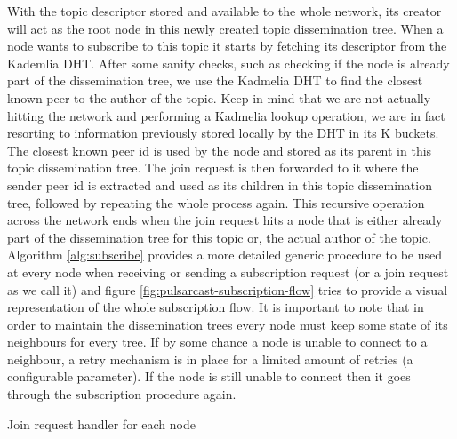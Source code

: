 With the topic descriptor stored and available to the whole network, its
creator will act as the root node in this newly created topic dissemination
tree. When a node wants to subscribe to this topic it starts by fetching its
descriptor from the Kademlia DHT. After some sanity checks, such as checking if
the node is already part of the dissemination tree, we use the Kadmelia DHT to
find the closest known peer to the author of the topic. Keep in mind that we
are not actually hitting the network and performing a Kadmelia lookup
operation, we are in fact resorting to information previously stored locally by
the DHT in its K buckets. The closest known peer id is used by the node and
stored as its parent in this topic dissemination tree. The join request is then
forwarded to it where the sender peer id is extracted and used as its children
in this topic dissemination tree, followed by repeating the whole process
again. This recursive operation across the network ends when the join request
hits a node that is either already part of the dissemination tree for this
topic or, the actual author of the topic. Algorithm \ref{alg:subscribe}
provides a more detailed generic procedure to be used at every node when
receiving or sending a subscription request (or a join request as we call it)
and figure \ref{fig:pulsarcast-subscription-flow} tries to provide a visual
representation of the whole subscription flow. It is important to note that in
order to maintain the dissemination trees every node must keep some state of
its neighbours for every tree. If by some chance a node is unable to connect to
a neighbour, a retry mechanism is in place for a limited amount of retries (a
configurable parameter). If the node is still unable to connect then it goes
through the subscription procedure again.

\vspace{8pt}
\begin{algorithm}[H]
  \SetAlgoLined
  \caption{Join request handler for each node}
	\label{alg:subscribe}
\end{algorithm}
\vspace{8pt}

